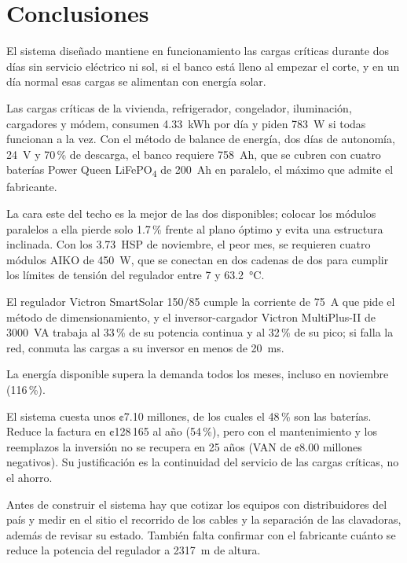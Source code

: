 \FloatBarrier
\section{Conclusiones}

El sistema diseñado mantiene en funcionamiento las cargas críticas durante dos días sin servicio eléctrico ni sol, si el banco está lleno al empezar el corte, y en un día normal esas cargas se alimentan con energía solar.

Las cargas críticas de la vivienda, refrigerador, congelador, iluminación, cargadores y módem, consumen \SI{4.33}{kWh} por día y piden \SI{783}{W} si todas funcionan a la vez. Con el método de balance de energía, dos días de autonomía, \SI{24}{V} y 70\,\% de descarga, el banco requiere \SI{758}{Ah}, que se cubren con cuatro baterías Power Queen LiFePO\textsubscript{4} de \SI{200}{Ah} en paralelo, el máximo que admite el fabricante.

La cara este del techo es la mejor de las dos disponibles; colocar los módulos paralelos a ella pierde solo 1.7\,\% frente al plano óptimo y evita una estructura inclinada. Con los \SI{3.73}{HSP} de noviembre, el peor mes, se requieren cuatro módulos AIKO de \SI{450}{W}, que se conectan en dos cadenas de dos para cumplir los límites de tensión del regulador entre 7 y \SI{63.2}{\celsius}.

El regulador Victron SmartSolar 150/85 cumple la corriente de \SI{75}{A} que pide el método de dimensionamiento, y el inversor-cargador Victron MultiPlus-II de \SI{3000}{VA} trabaja al 33\,\% de su potencia continua y al 32\,\% de su pico; si falla la red, conmuta las cargas a su inversor en menos de \SI{20}{ms}.

La energía disponible supera la demanda todos los meses, incluso en noviembre (116\,\%).

El sistema cuesta unos ¢7.10 millones, de los cuales el 48\,\% son las baterías. Reduce la factura en ¢128\,165 al año (54\,\%), pero con el mantenimiento y los reemplazos la inversión no se recupera en 25 años (VAN de ¢8.00 millones negativos). Su justificación es la continuidad del servicio de las cargas críticas, no el ahorro.

Antes de construir el sistema hay que cotizar los equipos con distribuidores del país y medir en el sitio el recorrido de los cables y la separación de las clavadoras, además de revisar su estado. También falta confirmar con el fabricante cuánto se reduce la potencia del regulador a \SI{2317}{m} de altura.
